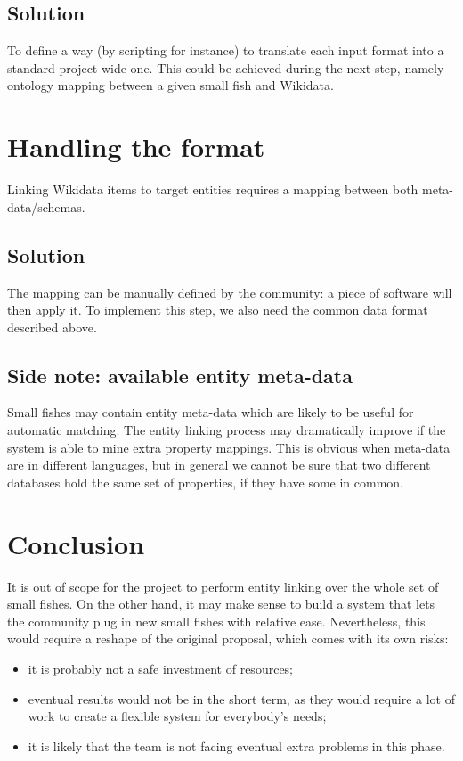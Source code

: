 \subsection{Solution}
\label{cha:322}
To define a way (by scripting for instance) to translate each input format into a standard project-wide one. This could be achieved during the next step, namely ontology mapping between a given small fish and Wikidata.

\section{Handling the format}
\label{cha:33}
Linking Wikidata items to target entities requires a mapping between both meta-data/schemas.

\subsection{Solution}
\label{cha:331}
The mapping can be manually defined by the community: a piece of software will then apply it. To implement this step, we also need the common data format described above.

\subsection{Side note: available entity meta-data}
\label{cha:332}
Small fishes may contain entity meta-data which are likely to be useful for automatic matching. The entity linking process may dramatically improve if the system is able to mine extra property mappings. This is obvious when meta-data are in different languages, but in general we cannot be sure that two different databases hold the same set of properties, if they have some in common.

\section{Conclusion}
\label{cha:34}
It is out of scope for the project to perform entity linking over the whole set of small fishes. On the other hand, it may make sense to build a system that lets the community plug in new small fishes with relative ease. Nevertheless, this would require a reshape of the original proposal, which comes with its own risks:
\begin{itemize}
\item it is probably not a safe investment of resources;
\item eventual results would not be in the short term, as they would require a lot of work to create a flexible system for everybody's needs;
\item it is likely that the team is not facing eventual extra problems in this phase.
\end{itemize}

